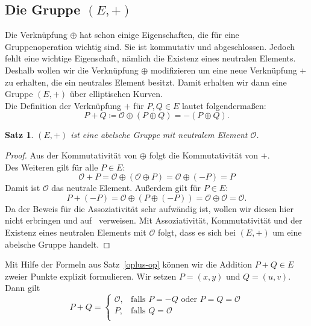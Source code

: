 \documentclass[hidelinks]{article}
\theoremstyle{plain}
\newtheorem{thm}{Satz}[section]
\theoremstyle{definition}
\theoremstyle{rem}
\newcommand{\patinf}{\mathcal{O}}
\begin{document}
\begin{sloppypar}
\subsection{Die Gruppe $(E, +)$}
Die Verknüpfung $\oplus$ hat schon einige Eigenschaften, die für eine Gruppenoperation wichtig sind.
Sie ist kommutativ und abgeschlossen. Jedoch fehlt eine wichtige Eigenschaft, nämlich die Existenz eines neutralen Elements.
Deshalb wollen wir die Verknüpfung $\oplus$ modifizieren um eine neue Verknüpfung $+$ zu erhalten, die ein neutrales Element besitzt. 
Damit erhalten wir dann eine Gruppe $(E, +)$ über elliptischen Kurven. \\
Die Definition der Verknüpfung $+$ für $P, Q \in E$ lautet folgendermaßen:
\begin{equation*} \label{plus-op}
    P + Q \coloneqq \patinf \oplus (P \oplus Q) = -(P \oplus Q).
\end{equation*}
\begin{thm}
    $(E, +)$ ist eine abelsche Gruppe mit neutralem Element $\patinf$.
\end{thm}
\begin{proof}
    Aus der Kommutativität von $\oplus$ folgt die Kommutativität von $+$. \\
    Des Weiteren gilt für alle $P \in E$:
    \begin{equation*}
        \patinf + P = \patinf \oplus (\patinf \oplus P) = \patinf \oplus (-P) = P
    \end{equation*}
    Damit ist $\patinf$ das neutrale Element. Außerdem gilt für $P \in E$:
    \begin{equation*}
        P + (-P) = \patinf \oplus (P \oplus (-P)) = \patinf \oplus \patinf = \patinf.
    \end{equation*}
    Da der Beweis für die Assoziativität sehr aufwändig ist, wollen wir diesen hier nicht erbringen und auf~\cite[Seite~20]{washington} verweisen.
    Mit Assoziativität, Kommutativität und der Existenz eines neutralen Elements mit $\patinf$ folgt, dass es sich bei $(E, +)$ um eine abelsche Gruppe handelt.
\end{proof}
Mit Hilfe der Formeln aus Satz~\ref{oplus-op} können wir die Addition $P + Q \in E$ zweier Punkte explizit formulieren.
Wir setzen $P = (x,y)$ und $Q = (u,v)$. Dann gilt 
\begin{equation*} \label{addition-faelle}
    P + Q = \begin{cases}
        \patinf, & \text{falls $P=-Q$ oder $P=Q=\patinf$} \\
        P, & \text{falls $Q=\patinf$} \\

\end{cases}
\end{equation*}
\end{sloppypar}
\end{document}
